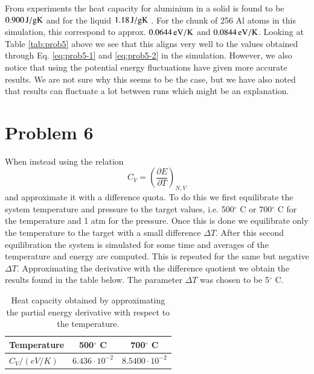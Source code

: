 From experiments the heat capacity for aluminium in a solid is found to be $\unit[0.900]{J/g K}$ \cite{al_heat_solid} and for the liquid $\unit[1.18]{J/g K}$ \cite{al_heat_liquid}. For the chunk of 256 Al atoms in this simulation, this correspond to approx. $\unit[0.0644]{eV/K}$ and $\unit[0.0844]{eV/K}$. Looking at Table \ref{tab:prob5} above we see that this aligns very well to the values obtained through Eq. \eqref{eq:prob5-1} and \eqref{eq:prob5-2} in the simulation. However, we also notice that using the potential energy fluctuations have given more accurate results. We are not sure why this seems to be the case, but we have also noted that results can fluctuate a lot between runs which might be an explanation.



\section*{Problem 6}

When instead using the relation
\begin{equation}
	C_V = \left( \frac{\partial E}{\partial T} \right)_{N,V}
\end{equation}
and approximate it with a difference quota. To do this we first equilibrate the system temperature and pressure to the target values, i.e. 500$^\circ$ C or 700$^\circ$ C for the temperature and 1 atm for the pressure. Once this is done we equilibrate only the temperature to the target with a small difference $\Delta T$. After this second equilibration the system is simulated for some time and averages of the temperature and energy are computed. This is repeated for the same but negative $\Delta T$. Approximating the derivative with the difference quotient we obtain the results found in the table below. The parameter $\Delta T$ was chosen to be 5$^\circ$ C.

\begin{table}[h!]
	\centering	
	\caption{Heat capacity obtained by approximating the partial energy derivative with respect to the temperature.}
	\begin{tabular}{l|cc}
		\hline \textbf{Temperature} & \textbf{500$^\circ$ C} & \textbf{700$^\circ$ C} \\ \hline
		$C_V / (\unit{eV/K})$ & $6.436 \cdot 10^{-2}$ & $8.5400 \cdot 10^{-2}$ \\ \hline
	\end{tabular}
	\label{tab:prob6}
\end{table}

